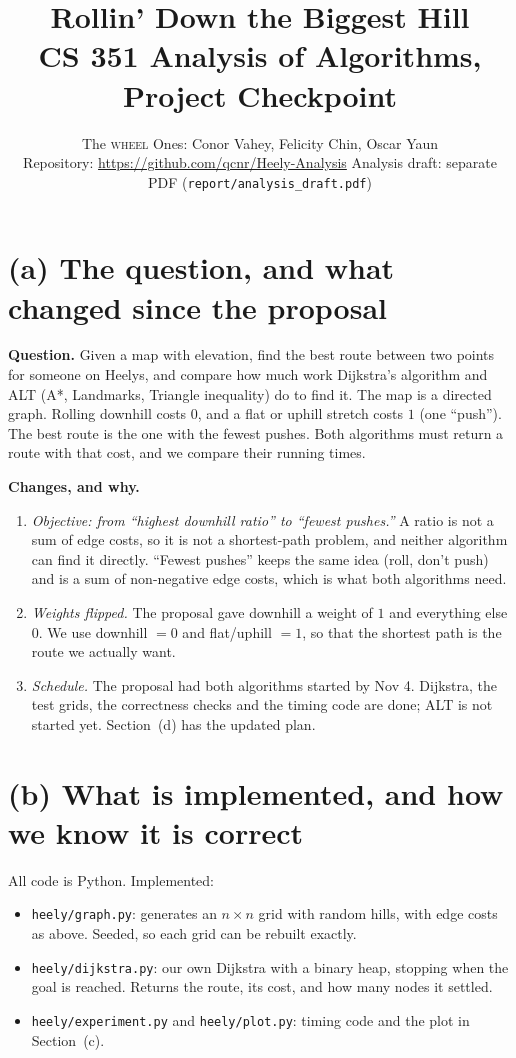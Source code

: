 \documentclass[11pt]{article}
\title{\vspace{-2.4em}\textbf{Rollin' Down the Biggest Hill}\\
\large CS 351 Analysis of Algorithms, Project Checkpoint}
\author{The \textsc{wheel} Ones: Conor Vahey, Felicity Chin, Oscar Yaun\\
\small Repository: \url{https://github.com/qcnr/Heely-Analysis}\quad
Analysis draft: separate PDF (\texttt{report/analysis\_draft.pdf})}
\date{\vspace{-2.6em}}
\begin{document}
\maketitle

\section{(a) The question, and what changed since the proposal}

\textbf{Question.} Given a map with elevation, find the best route between two points for someone on Heelys, and compare how much work Dijkstra's algorithm and ALT (A*, Landmarks, Triangle inequality) do to find it. The map is a directed graph. Rolling downhill costs $0$, and a flat or uphill stretch costs $1$ (one ``push''). The best route is the one with the fewest pushes. Both algorithms must return a route with that cost, and we compare their running times.

\textbf{Changes, and why.}
\begin{enumerate}
\item \textit{Objective: from ``highest downhill ratio'' to ``fewest pushes.''} A ratio is not a sum of edge costs, so it is not a shortest-path problem, and neither algorithm can find it directly. ``Fewest pushes'' keeps the same idea (roll, don't push) and is a sum of non-negative edge costs, which is what both algorithms need.
\item \textit{Weights flipped.} The proposal gave downhill a weight of $1$ and everything else $0$. We use downhill $=0$ and flat/uphill $=1$, so that the shortest path is the route we actually want.
\item \textit{Schedule.} The proposal had both algorithms started by Nov 4. Dijkstra, the test grids, the correctness checks and the timing code are done; ALT is not started yet. Section~(d) has the updated plan.
\end{enumerate}

\section{(b) What is implemented, and how we know it is correct}

All code is Python. Implemented:
\begin{itemize}
\item \texttt{heely/graph.py}: generates an $n\times n$ grid with random hills, with edge costs as above. Seeded, so each grid can be rebuilt exactly.
\item \texttt{heely/dijkstra.py}: our own Dijkstra with a binary heap, stopping when the goal is reached. Returns the route, its cost, and how many nodes it settled.
\item \texttt{heely/experiment.py} and \texttt{heely/plot.py}: timing code and the plot in Section~(c).
\end{itemize}
\end{document}
